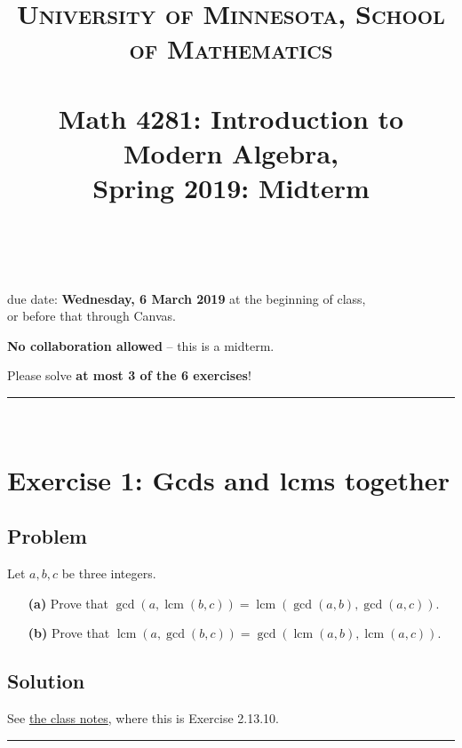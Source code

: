 \documentclass[paper=a4, fontsize=12pt]{scrartcl} %
\title{	
\normalfont \normalsize 
\textsc{University of Minnesota, School of Mathematics} \\ [25pt] %
\horrule{0.5pt} \\[0.4cm] %
\huge Math 4281: Introduction to Modern Algebra, \\
Spring 2019:
Midterm \psetnumber\\%
\horrule{2pt} \\[0.5cm] %
}
\author{\myname}
\newcommand{\lcm}{\operatorname{lcm}}
\newcommand{\tup}[1]{\left( #1 \right)}
\newcommand{\horrule}[1]{\rule{\linewidth}{#1}} %
\theoremstyle{plainsl}
\theoremstyle{definition}
\theoremstyle{remark}
\begin{document}
\maketitle %

\begin{center} %
{\large due date: \textbf{Wednesday, 6 March 2019} at the beginning of class, \\
or before that through Canvas.

\textbf{No collaboration allowed} -- this is a midterm.

Please solve \textbf{at most 3 of the 6 exercises}!}
\end{center}

\horrule{0.3pt} \\[0.4cm]

\section{Exercise 1: Gcds and lcms together}

\subsection{Problem}

Let $a, b, c$ be three integers.

\begin{enumerate}

\item[\textbf{(a)}]
Prove that
$\gcd\tup{a, \lcm\tup{b, c}}
= \lcm\tup{\gcd\tup{a, b}, \gcd\tup{a, c}}$.

\item[\textbf{(b)}]
Prove that
$\lcm\tup{a, \gcd\tup{b, c}}
= \gcd\tup{\lcm\tup{a, b}, \lcm\tup{a, c}}$.

\end{enumerate}

\subsection{Solution}

See
\href{http://www-users.math.umn.edu/~dgrinber/19s/notes.pdf}{the class notes},
where this is Exercise 2.13.10.

\horrule{0.3pt} \\[0.4cm]
\end{document}
